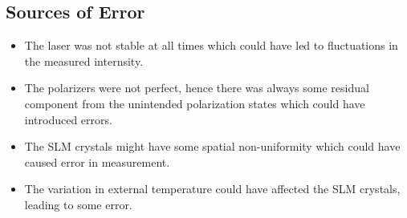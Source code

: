 \subsection{Sources of Error}
\begin{itemize}
  \item The laser was not stable at all times which could have led to fluctuations in the measured internsity.
  \item The polarizers were not perfect, hence there was always some residual component from the unintended polarization states which could have introduced errors.
  \item The SLM crystals might have some spatial non-uniformity which could have caused error in measurement. 
  \item The variation in external temperature could have affected the SLM crystals, leading to some error. 
\end{itemize}
